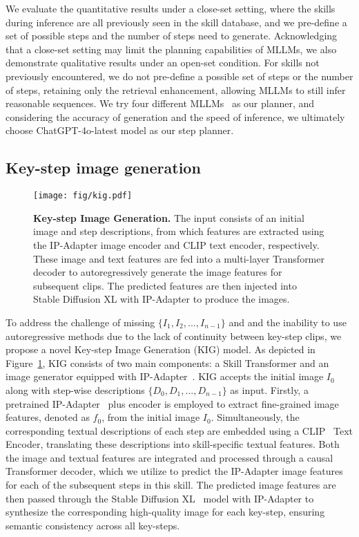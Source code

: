 We evaluate the quantitative results under a close-set setting, where the skills during inference are all previously seen in the skill database, and we pre-define a set of possible steps and the number of steps need to generate. Acknowledging that a close-set setting may limit the planning capabilities of MLLMs, we also demonstrate qualitative results under an open-set condition. For skills not previously encountered, we do not pre-define a possible set of steps or the number of steps, retaining only the retrieval enhancement, allowing MLLMs to still infer reasonable sequences. We try four different MLLMs~\cite{gpt-4o,gpt-4o-mini,claude} as our planner, and considering the accuracy of generation and the speed of inference, we ultimately choose ChatGPT-4o-latest model as our step planner.

\subsection{Key-step image generation}
\label{image generation}


\begin{figure}[t]
  \centering
   \texttt{[image: fig/kig.pdf]}
   \caption{\textbf{Key-step Image Generation.} The input consists of an initial image and step descriptions, from which features are extracted using the IP-Adapter image encoder and CLIP text encoder, respectively. These image and text features are fed into a multi-layer Transformer decoder to autoregressively generate the image features for subsequent clips. The predicted features are then injected into Stable Diffusion XL with IP-Adapter to produce the images.}
   \label{fig:kig}
   \vspace{-10pt}
\end{figure}

To address the challenge of missing $\{I_1, I_2,...,I_{n-1}\}$ and and the inability to use autoregressive methods due to the lack of continuity between key-step clips, we propose a novel Key-step Image Generation (KIG) model. As depicted in Figure~\ref{fig:kig}, KIG consists of two main components: a Skill Transformer and an image generator equipped with IP-Adapter~\cite{ip}. KIG accepts the initial image $I_0$ along with step-wise descriptions $\{D_0, D_1, ..., D_{n-1}\}$ as input. Firstly, a pretrained IP-Adapter~\cite{ip} plus encoder is employed to extract fine-grained image features, denoted as $f_0$, from the initial image $I_0$. Simultaneously, the corresponding textual descriptions of each step are embedded using a CLIP~\cite{clip} Text Encoder, translating these descriptions into skill-specific textual features. Both the image and textual features are integrated and processed through a causal Transformer decoder, which we utilize to predict the IP-Adapter image features for each of the subsequent steps in this skill.
The predicted image features are then passed through the Stable Diffusion XL~\cite{sdxl} model with IP-Adapter to synthesize the corresponding high-quality image for each key-step, ensuring semantic consistency across all key-steps.

